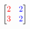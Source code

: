 \documentclass[preview]{standalone}
\begin{document}
\begin{align*}
\begin{bmatrix} {\color{red}2} & {\color{blue}2} \\ {\color{red}3} & {\color{blue}2} \end{bmatrix}
\end{align*}
\end{document}
